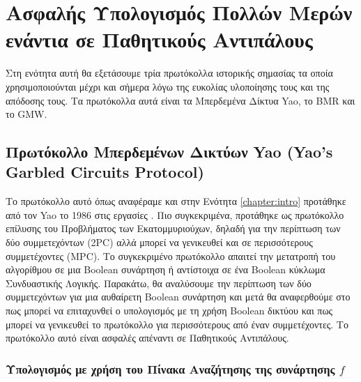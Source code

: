 \section{Ασφαλής Υπολογισμός Πολλών Μερών ενάντια σε Παθητικούς Αντιπάλους}

Στη ενότητα αυτή θα εξετάσουμε τρία πρωτόκολλα ιστορικής σημασίας τα οποία χρησιμοποιούνται μέχρι και σήμερα λόγω της ευκολίας υλοποίησης τους και της απόδοσης τους. Τα πρωτόκολλα αυτά είναι τα Μπερδεμένα Δίκτυα Yao, το BMR και το GMW.

\subsection{Πρωτόκολλο Μπερδεμένων Δικτύων Yao (Yao's Garbled Circuits Protocol)}

Το πρωτόκολλο αυτό όπως αναφέραμε και στην Ενότητα \ref{chapter:intro} προτάθηκε από τον Yao το 1986 στις εργασίες \cite{4568207} \cite{4568388}. Πιο συγκεκριμένα, προτάθηκε ως πρωτόκολλο επίλυσης του Προβλήματος των Εκατομμυριούχων, δηλαδή για την περίπτωση των δύο συμμετεχόντων (2PC) αλλά μπορεί να γενικευθεί και σε περισσότερους συμμετέχοντες (MPC). Το συγκεκριμένο πρωτόκολλο απαιτεί την μετατροπή του αλγορίθμου σε μια Boolean συνάρτηση ή αντίστοιχα σε ένα Boolean κύκλωμα Συνδυαστικής Λογικής. Παρακάτω, θα αναλύσουμε την περίπτωση των δύο συμμετεχόντων για μια αυθαίρετη Boolean συνάρτηση και μετά θα αναφερθούμε στο πως μπορεί να επιταχυνθεί ο υπολογισμός με τη χρήση Boolean δικτύου και πως μπορεί να γενικευθεί το πρωτόκολλο για περισσότερους από έναν συμμετέχοντες. Το πρωτόκολλο αυτό είναι ασφαλές απέναντι σε Παθητικούς Αντιπάλους.

\subsubsection{Υπολογισμός με χρήση του Πίνακα Αναζήτησης της συνάρτησης $f$}

